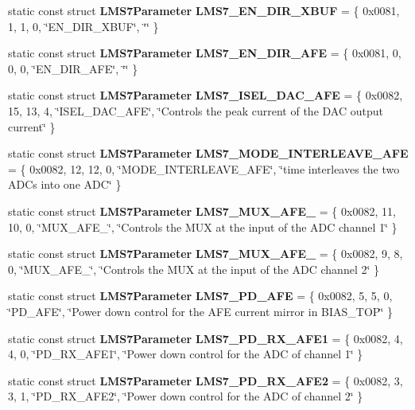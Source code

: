 \begin{DoxyCompactItemize}
\item 
static const struct {\bf L\+M\+S7\+Parameter} {\bf L\+M\+S7\+\_\+\+E\+N\+\_\+\+D\+I\+R\+\_\+\+X\+B\+UF} = \{ 0x0081, 1, 1, 0, \char`\"{}\+E\+N\+\_\+\+D\+I\+R\+\_\+\+X\+B\+U\+F\char`\"{}, \char`\"{}\char`\"{} \}
\item 
static const struct {\bf L\+M\+S7\+Parameter} {\bf L\+M\+S7\+\_\+\+E\+N\+\_\+\+D\+I\+R\+\_\+\+A\+FE} = \{ 0x0081, 0, 0, 0, \char`\"{}\+E\+N\+\_\+\+D\+I\+R\+\_\+\+A\+F\+E\char`\"{}, \char`\"{}\char`\"{} \}
\item 
static const struct {\bf L\+M\+S7\+Parameter} {\bf L\+M\+S7\+\_\+\+I\+S\+E\+L\+\_\+\+D\+A\+C\+\_\+\+A\+FE} = \{ 0x0082, 15, 13, 4, \char`\"{}\+I\+S\+E\+L\+\_\+\+D\+A\+C\+\_\+\+A\+F\+E\char`\"{}, \char`\"{}\+Controls the peak current of the D\+A\+C output current\char`\"{} \}
\item 
static const struct {\bf L\+M\+S7\+Parameter} {\bf L\+M\+S7\+\_\+\+M\+O\+D\+E\+\_\+\+I\+N\+T\+E\+R\+L\+E\+A\+V\+E\+\_\+\+A\+FE} = \{ 0x0082, 12, 12, 0, \char`\"{}\+M\+O\+D\+E\+\_\+\+I\+N\+T\+E\+R\+L\+E\+A\+V\+E\+\_\+\+A\+F\+E\char`\"{}, \char`\"{}time interleaves the two A\+D\+Cs into one A\+D\+C\char`\"{} \}
\item 
static const struct {\bf L\+M\+S7\+Parameter} {\bf L\+M\+S7\+\_\+\+M\+U\+X\+\_\+\+A\+F\+E\+\_} = \{ 0x0082, 11, 10, 0, \char`\"{}\+M\+U\+X\+\_\+\+A\+F\+E\+\_\char`\"{}, \char`\"{}\+Controls the M\+U\+X at the input of the A\+D\+C channel 1\char`\"{} \}
\item 
static const struct {\bf L\+M\+S7\+Parameter} {\bf L\+M\+S7\+\_\+\+M\+U\+X\+\_\+\+A\+F\+E\+\_} = \{ 0x0082, 9, 8, 0, \char`\"{}\+M\+U\+X\+\_\+\+A\+F\+E\+\_\char`\"{}, \char`\"{}\+Controls the M\+U\+X at the input of the A\+D\+C channel 2\char`\"{} \}
\item 
static const struct {\bf L\+M\+S7\+Parameter} {\bf L\+M\+S7\+\_\+\+P\+D\+\_\+\+A\+FE} = \{ 0x0082, 5, 5, 0, \char`\"{}\+P\+D\+\_\+\+A\+F\+E\char`\"{}, \char`\"{}\+Power down control for the A\+F\+E current mirror in B\+I\+A\+S\+\_\+\+T\+O\+P\char`\"{} \}
\item 
static const struct {\bf L\+M\+S7\+Parameter} {\bf L\+M\+S7\+\_\+\+P\+D\+\_\+\+R\+X\+\_\+\+A\+F\+E1} = \{ 0x0082, 4, 4, 0, \char`\"{}\+P\+D\+\_\+\+R\+X\+\_\+\+A\+F\+E1\char`\"{}, \char`\"{}\+Power down control for the A\+D\+C of channel 1\char`\"{} \}
\item 
static const struct {\bf L\+M\+S7\+Parameter} {\bf L\+M\+S7\+\_\+\+P\+D\+\_\+\+R\+X\+\_\+\+A\+F\+E2} = \{ 0x0082, 3, 3, 1, \char`\"{}\+P\+D\+\_\+\+R\+X\+\_\+\+A\+F\+E2\char`\"{}, \char`\"{}\+Power down control for the A\+D\+C of channel 2\char`\"{} \}

\end{DoxyCompactItemize}

